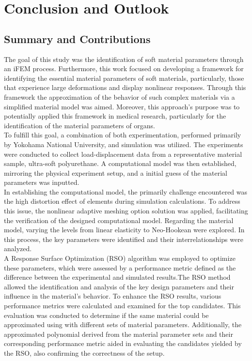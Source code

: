 
\chapter{Conclusion and Outlook} %

\label{Chapter7} %

\section{Summary and Contributions}
The goal of this study was the identification of soft material parameters through 
an iFEM process. Furthermore, this work focused on developing a framework for identifying the 
essential material parameters of soft materials, particularly, those that experience 
large deformations and display nonlinear responses. Through this framework the 
approximation of the behavior of such complex materials via a simplified material model
was aimed. Moreover, this approach's purpose was to potentially applied this framework in medical research,
particularly for the identification of the material parameters of organs.\\

To fulfill this goal, a combination of both experimentation, performed primarily by Yokohama National University, 
and simulation was utilized. The experiments were conducted to collect load-displacement data from
a representative material sample, ultra-soft polyurethane. A computational model was then 
established, mirroring the physical experiment setup, and a initial guess of the material 
parameters was inputted.\\

In establishing the computational model, the primarily challenge encountered was the 
high distortion effect of elements during simulation calculations. To address this issue, the nonlinear adaptive 
meshing option solution was applied, facilitating the verification of the designed 
computational model. Regarding the material model, varying the levels from linear elasticity to 
Neo-Hookean were explored. In this process, the key parameters were identified and their interrelationships were analyzed.\\

A Response Surface Optimization (RSO) algorithm was employed to optimize these 
parameters, which were assessed by a performance metric defined as the difference between the 
experimental and simulated results.The RSO method allowed the identification and analysis of the 
key design parameters and their influence in the material's behavior. 
To enhance the RSO results, various performance metrics were calculated and examined for 
the top candidates. This evaluation was conducted to determine if the same material could be approximated 
using with different sets of material parameters. Additionally, the approximated polynomial derived 
from the material parameter sets and their corresponding performance metric aided in evaluating the 
candidates yielded by the RSO, also confirming the correctness of the setup.\\

